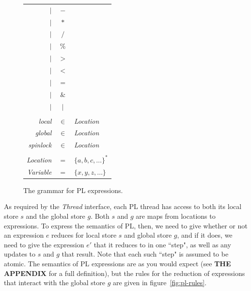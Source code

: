\documentclass[12pt,a4paper,twoside,openright]{report}
\begin{document}
\begin{figure}
\begin{tabular}{rcl}
		$\vert$ & $-$ &\\
		$\vert$ & $\ast$ &\\
		$\vert$ & $/$ &\\
		$\vert$ & $\%$ &\\
		$\vert$ & $>$ &\\
		$\vert$ & $<$ &\\
		$\vert$ & $=$ &\\
		$\vert$ & $\&$ &\\
		$\vert$ & $\mid$ &\\
		& &\\
		\textit{local} & $\in$ & \textit{Location} \\
		\textit{global} & $\in$ & \textit{Location} \\
		\textit{spinlock} & $\in$ & \textit{Location} \\
		& &\\
		\textit{Location} & $=$ & $\{a, b, c, \ldots\}^\ast$\\
		\textit{Variable} & $=$& $\{x, y, z, \ldots\}$ \\
	\end{tabular}
	\caption{The grammar for PL expressions.}
	\label{fig:pl-expressions}
\end{figure}

As required by the \emph{Thread} interface, each
PL thread has access to both its local store $s$
and the global store $g$. Both $s$ and $g$ are
maps from locations to expressions.
To express the semantics
of PL, then, we need to give whether or not an
expression $e$ reduces for local store $s$ and
global store $g$, and if it does, we need to give
the expression $e'$ that it reduces to in one ``step",
as well as any updates to $s$ and $g$ that result.
Note that each such ``step" is assumed to be atomic.
The semantics of PL expressions are as you would expect
(see \textbf{THE APPENDIX} for a full definition), but
the rules for the reduction of expressions that interact
with the global store $g$ are given in figure~\ref{fig:pl-rules}.
\end{document}
